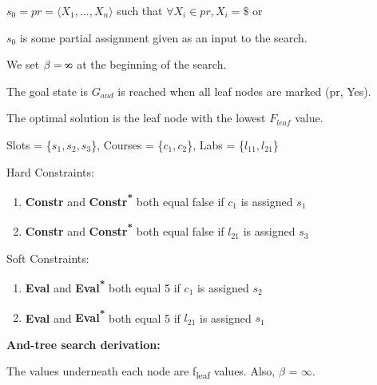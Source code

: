 \documentclass[11pt, oneside]{article}   	%
\def\infinity{\rotatebox{90}{8}}
\begin{document}
\centerline{$s_0 = pr = \langle X_1, ..., X_n \rangle $ such that $\forall X_i \in pr, X_i = \$ $ or}
\centerline{$s_0$ is some partial assignment given as an input to the search.}

\noindent We set $\beta = \infinity$ at the beginning of the search.

\noindent The goal state is $G_{and}$ is reached when all leaf nodes are marked (pr, Yes).

\noindent The optimal solution is the leaf node with the lowest $F_{leaf}$ value.
\newpage


\noindent Slots = \{$s_1, s_2, s_3$\}, Courses = \{$c_1, c_2$\}, Labs = \{$l_{11}, l_{21}$\}

\noindent Hard Constraints:
\begin{enumerate}[topsep=0pt, itemsep=0pt]
\item \textbf{Constr} and \textbf{Constr\textsuperscript{*}} both equal false if $c_1$ is assigned $s_1$
\item \textbf{Constr} and \textbf{Constr\textsuperscript{*}} both equal false if $l_{21}$ is assigned $s_3$
\end{enumerate}

\noindent Soft Constraints:
\begin{enumerate}[topsep=0pt, itemsep=0pt]
\item \textbf{Eval} and \textbf{Eval\textsuperscript{*}} both equal 5 if $c_1$ is assigned $s_2$
\item \textbf{Eval} and \textbf{Eval\textsuperscript{*}} both equal 5 if $l_{21}$ is assigned $s_1$
\end{enumerate}

\noindent \textbf{And-tree search derivation:}

\noindent The values underneath each node are f\textsubscript{leaf} values. Also, $\beta$ = $\infty$.

\newpage
\end{document}
